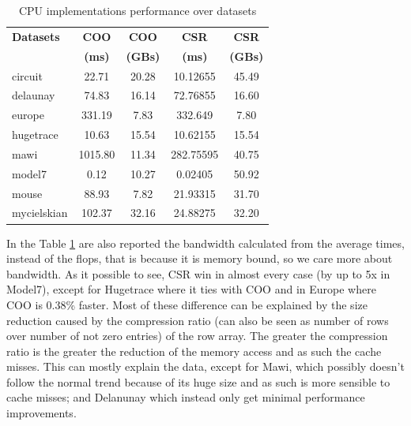 \documentclass[conference]{IEEEtran}
\begin{document}
\begin{table}[h!]
	\centering
	\begin{adjustbox}{width=0.9\columnwidth}
		\begin{tabular}{lcccc}
			\toprule
			\textbf{Datasets} & \textbf{COO} & \textbf{COO} & \textbf{CSR} & \textbf{CSR} \\
			& \textbf{(ms)} & \textbf{(GBs)} & \textbf{(ms)} & \textbf{(GBs)} \\
			\midrule
			circuit & 22.71 & 20.28 & 10.12655 & 45.49 \\
			delaunay & 74.83 & 16.14 & 72.76855 & 16.60 \\
			europe & 331.19 & 7.83 & 332.649 & 7.80 \\
			hugetrace & 10.63 & 15.54 & 10.62155 & 15.54 \\
			mawi & 1015.80 & 11.34 & 282.75595 & 40.75 \\
			model7 & 0.12 & 10.27 & 0.02405 & 50.92 \\
			mouse & 88.93 & 7.82 & 21.93315 & 31.70 \\
			mycielskian & 102.37 & 32.16 & 24.88275 & 32.20 \\
		\end{tabular}
	\end{adjustbox}
	\vspace{1em}

	\caption{CPU implementations performance over datasets}
	\label{tab:time-cpu-results}
\end{table}
\FloatBarrier

In the Table \ref{tab:time-cpu-results} are also reported the bandwidth calculated from the average times, instead of the flops, that is because it is memory bound, so we care more about bandwidth. As it possible to see, CSR win in almost every case (by up to 5x in Model7), except for Hugetrace where it ties with COO and in Europe where COO is 0.38\% faster. Most of these difference can be explained by the size reduction caused by the compression ratio (can also be seen as number of rows over number of not zero entries) of the row array. The greater the compression ratio is the greater the reduction of the memory access and as such the cache misses. This can mostly explain the data, except for Mawi, which possibly doesn't follow the normal trend because of its huge size and as such is more sensible to cache misses; and Delanunay which instead only get minimal performance improvements.
\end{document}
